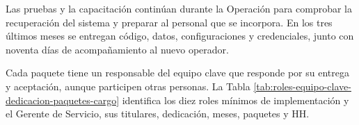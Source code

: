 \documentclass[formulario]{../../comun/overfore}
\begin{document}
Las pruebas y la capacitación continúan durante la Operación para comprobar la recuperación del sistema y preparar al personal que se incorpora. En los tres últimos meses se entregan código, datos, configuraciones y credenciales, junto con noventa días de acompañamiento al nuevo operador.

Cada paquete tiene un responsable del equipo clave que responde por su entrega y aceptación, aunque participen otras personas. La Tabla \ref{tab:roles-equipo-clave-dedicacion-paquetes-cargo} identifica los diez roles mínimos de implementación y el Gerente de Servicio, sus titulares, dedicación, meses, paquetes y HH.
\end{document}
